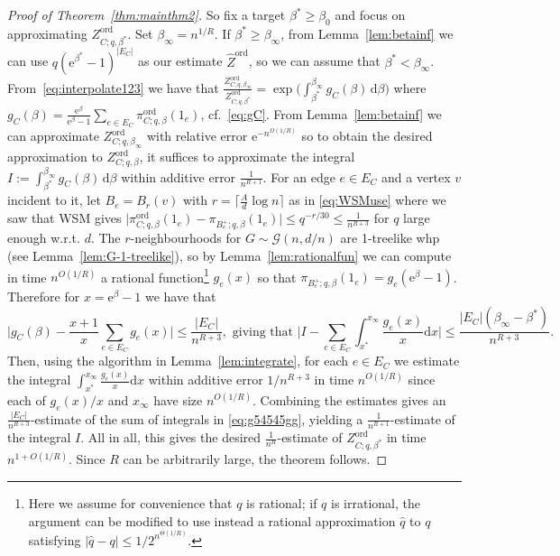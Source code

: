 \documentclass[11pt]{article}
\theoremstyle{plain}
\newcommand{\emm}{\mathrm{e}}
\newcommand{\1}{\mathbb{1}}
\newcommand{\ord}{\mathrm{ord}}
\begin{document}
\begin{proof}[Proof of Theorem~\ref{thm:mainthm2}]
So fix a target $\beta^*\geq \beta_0$ and focus on approximating $Z^{\ord}_{C;q,\beta^*}$. Set $\beta_\infty= n^{1/R}$. If $\beta^*\geq \beta_\infty$, from Lemma~\ref{lem:betainf} we can use $q(\emm^{\beta^*}-1)^{|E_C|}$ as our estimate $\hat Z^\ord$, so we can assume that $\beta^*<\beta_\infty$.  From~\eqref{eq:interpolate123} we have that $\frac{Z^{\ord}_{C;q,\beta_\infty}}{Z^{\ord}_{C;q,\beta^*}}=\exp\bigg(\int^{\beta_\infty}_{\beta^*}g_C(\beta)\,\mathrm{d} \beta\bigg)$ where $g_C(\beta)=\frac{\emm^{\beta}}{\emm^{\beta}-1}\sum_{e\in E_C} \pi^\ord_{C;q,\beta}(1_e)$, cf.~\eqref{eq:gC}.
From Lemma~\ref{lem:betainf} we can approximate $Z^{\ord}_{C;q,\beta_\infty}$ with relative error $\emm^{-n^{\Omega(1/R)}}$   so 
to obtain the desired approximation to $Z^{\ord}_{C;q,\beta}$, it suffices to approximate the integral $I:=\int^{\beta_\infty}_{\beta^*}g_C(\beta)\,\mathrm{d}\beta$ within additive error $\tfrac{1}{n^{R+1}}$.  
For an edge $e\in E_C$ and a vertex $v$ incident to it, let $B_e=B_r(v)$ with $r=\lceil \tfrac{A}{d}\log n\rceil$ as in \eqref{eq:WSMuse} where we saw that WSM gives $\big|\pi^\ord_{C;q,\beta}(1_e)-\pi_{B_e^+;q, \beta}(1_e)\big|\leq q^{-r/30}\leq \tfrac{1}{n^{R+3}}$ for $q$ large enough w.r.t. $d$. The $r$-neighbourhoods for $G\sim\mathcal{G}(n,d/n)$ are 1-treelike whp (see Lemma~\ref{lem:G-1-treelike}), so by Lemma~\ref{lem:rationalfun} we can compute in time $n^{O(1/R)}$ a rational function\footnote{Here we assume for convenience that $q$ is rational; if $q$ is irrational, the argument can be modified to use instead a rational approximation $\hat q$ to $q$ satisfying $|\hat q-q|\leq 1/2^{n^{\Theta(1/R)}}$.} $g_e(x)$ so that   $\pi_{B_e^+;q,\beta}(1_e)=g_e(\emm^{\beta}-1)$. Therefore for $x=\emm^{\beta}-1$ we have that
\begin{equation}\label{eq:g54545gg}
    \Big|g_C(\beta)-\frac{x+1}{x}\sum_{e\in E_C}g_e(x)\Big|\leq \frac{|E_C|}{n^{R+3}}, \mbox{ giving that } \Big|I-\sum_{e\in E_C}\int_{x^*}^{x_\infty} \frac{g_e(x)}{x} \mathrm{d} x\Big|\leq \frac{|E_C|(\beta_\infty-\beta^*)}{n^{R+3}}.
\end{equation}
Then, using the algorithm in Lemma~\ref{lem:integrate}, for each $e\in E_C$ we  estimate the integral $\int_{x^*}^{x_\infty} \frac{g_e(x)}{x} \mathrm{d} x$ within additive error $1/n^{R+3}$ in time $n^{O(1/R)}$ since each of $g_e(x)/x$ and $x_\infty$ have size $n^{O(1/R)}$. Combining the estimates gives an $\tfrac{|E_C|}{n^{R+3}}$-estimate of the sum of integrals in \eqref{eq:g54545gg}, yielding a $\tfrac{1}{n^{R+1}}$-estimate of the integral $I$. All in all, this gives the desired $\tfrac{1}{n^R}$-estimate of $Z^{\ord}_{C;q,\beta^*}$ in time $n^{1+O(1/R)}$. Since $R$ can be arbitrarily large, the theorem follows.
\end{proof}
\end{document}
